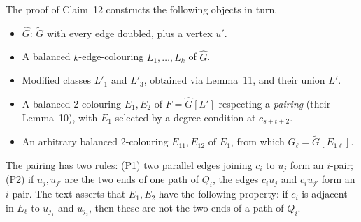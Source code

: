 \documentclass[11pt]{amsart}
\theoremstyle{definition}
\theoremstyle{remark}
\begin{document}
The proof of Claim~12 constructs the following objects in turn.
\begin{itemize}[leftmargin=*]
\item $\widehat G$: $\widetilde G$ with every edge doubled, plus a vertex $u'$.
\item A balanced $k$-edge-colouring $L_1,\dots,L_k$ of $\widehat G$.
\item Modified classes $L'_1$ and $L'_3$, obtained via Lemma~11, and their union $L'$.
\item A balanced 2-colouring $E_1,E_2$ of $F=\widehat G[L']$ respecting a \emph{pairing}
(their Lemma~10), with $E_1$ selected by a degree condition at $c_{s+t+2}$.
\item An arbitrary balanced 2-colouring $E_{11},E_{12}$ of $E_1$, from which
$G_\ell=\widetilde G[E_{1\ell}]$.
\end{itemize}
The pairing has two rules:
(P1) two parallel edges joining $c_i$ to $u_j$ form an $i$-pair;
(P2) if $u_j,u_{j'}$ are the two ends of one path of $Q_i$, the edges $c_iu_j$ and $c_iu_{j'}$
form an $i$-pair.
The text asserts that $E_1,E_2$ have the following property: if $c_i$ is adjacent in $E_\ell$ to
$u_{j_1}$ and $u_{j_2}$, then these are not the two ends of a path of $Q_i$.
\end{document}
